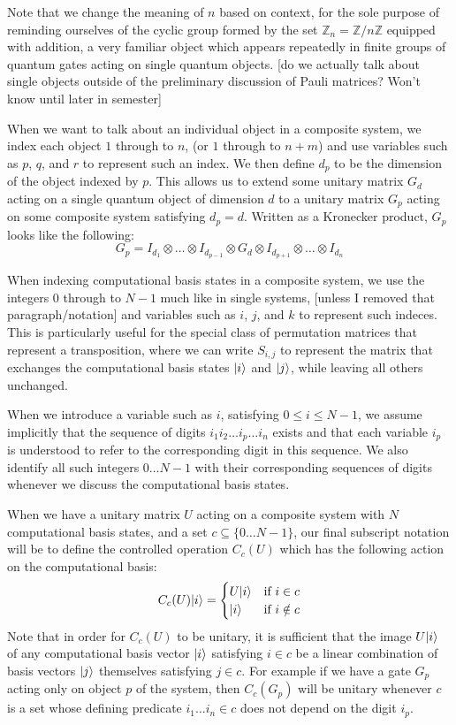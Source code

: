 Note that we change the meaning of $n$ based on context, for the sole purpose of reminding ourselves of the cyclic group formed by the set $\mathbb{Z}_n = \mathbb{Z}/n\mathbb{Z}$ equipped with addition, a very familiar object which appears repeatedly in finite groups of quantum gates acting on single quantum objects.
[do we actually talk about single objects outside of the preliminary discussion of Pauli matrices? Won't know until later in semester]

When we want to talk about an individual object in a composite system, we index each object $1$ through to $n$, (or $1$ through to $n+m$) and use variables such as $p$, $q$, and $r$ to represent such an index. We then define $d_p$ to be the dimension of the object indexed by $p$. This allows us to extend some unitary matrix $G_d$ acting on a single quantum object of dimension $d$ to a unitary matrix $G_p$ acting on some composite system satisfying $d_p = d$. Written as a Kronecker product, $G_p$ looks like the following:
\[G_p = I_{d_1}\otimes \dots \otimes I_{d_{p-1}} \otimes G_d \otimes I_{d_{p+1}} \otimes \dots \otimes I_{d_n}\]

When indexing computational basis states in a composite system, we use the integers $0$ through to $N-1$ much like in single systems, [unless I removed that paragraph/notation] and variables such as $i$, $j$, and $k$ to represent such indeces. This is particularly useful for the special class of permutation matrices that represent a transposition, where we can write $S_{i,j}$ to represent the matrix that exchanges the computational basis states $| i \rangle$ and $| j \rangle$, while leaving all others unchanged.

When we introduce a variable such as $i$, satisfying $0 \leq i \leq N-1$, we assume implicitly that the sequence of digits $i_1i_2\dots i_p \dots i_n$ exists and that each variable $i_p$ is understood to refer to the corresponding digit in this sequence. We also identify all such integers $0\dots N-1$ with their corresponding sequences of digits whenever we discuss the computational basis states.

When we have a unitary matrix $U$ acting on a composite system with $N$ computational basis states, and a set $c \subseteq \{0\dots N-1\}$, our final subscript notation will be to define the controlled operation $C_c(U)$ which has the following action on the computational basis:
\[C_c(U)| i \rangle = \begin{cases}
U| i \rangle & \text{if\ }i \in c \\
| i \rangle & \text{if\ }i \notin c
\end{cases}\]
Note that in order for $C_c(U)$ to be unitary, it is sufficient that the image $U| i \rangle$ of any computational basis vector $| i \rangle$ satisfying $i \in c$ be a linear combination of basis vectors $| j \rangle$ themselves satisfying $j \in c$. For example if we have a gate $G_p$ acting only on object $p$ of the system, then $C_c(G_p)$ will be unitary whenever $c$ is a set whose defining predicate $i_1\dots i_n \in c$ does not depend on the digit $i_p$.

